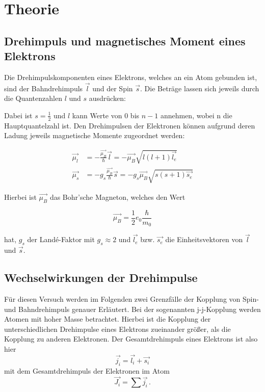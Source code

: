\section{Theorie}
\label{sec:Theorie}

\subsection{Drehimpuls und magnetisches Moment eines Elektrons}

Die Drehimpulskomponenten eines Elektrons, welches an ein Atom gebunden ist, sind der Bahndrehimpuls $\vec{l}$ und der Spin $\vec{s}$.
Die Beträge lassen sich jeweils durch die Quantenzahlen $l$ und $s$ ausdrücken:


Dabei ist $s= \frac{1}2$ und $l$ kann Werte von $0$ bis $n-1$ annehmen, wobei n die Hauptquantelzahl ist. 
Den Drehimpulsen der Elektronen können aufgrund deren Ladung jeweils magnetische Momente zugeordnet werden:

\begin{align}
    \vec{\mu_l} &= -\frac{\vec{\mu_B}}{\hbar}\vec{l} = -\vec{\mu_B}\sqrt{l(l+1)\vec{l_e}} \\
    \vec{\mu_s} &= -g_s\frac{\vec{\mu_B}}{\hbar}\vec{s} = -g_s\vec{\mu_B}\sqrt{s(s+1)\vec{s_e}} 
\end{align}

Hierbei ist $\vec{\mu_B}$ das Bohr'sche Magneton, welches den Wert 

\begin{equation}
    \vec{\mu_B} = \frac{1}2 e_0 \frac{\hbar}{m_0}
\end{equation}

hat, $g_s$ der Landé-Faktor mit $g_s\approx 2$ und $\vec{l_e}$ bzw. $\vec{s_e}$ die Einheitsvektoren von $\vec{l}$ und $\vec{s}$. 

\subsection{Wechselwirkungen der Drehimpulse}

Für diesen Versuch werden im Folgenden zwei Grenzfälle der Kopplung von Spin- und Bahndrehimpuls genauer Erläutert.
Bei der sogenannten j-j-Kopplung werden Atomen mit hoher Masse betrachtet. Hierbei ist die Kopplung der unterschiedlichen Drehimpulse eines 
Elektrons zueinander größer, als die Kopplung zu anderen Elektronen. Der Gesamtdrehimpuls eines Elektrons ist also hier 
\begin{equation}
    \vec{j_i} = \vec{l_i} + \vec{s_i}
\end{equation} mit dem Gesamtdrehimpuls der Elektronen im Atom 
\begin{equation}
    \vec{J_i} = \sum \vec{j_i}\,.
\end{equation}

